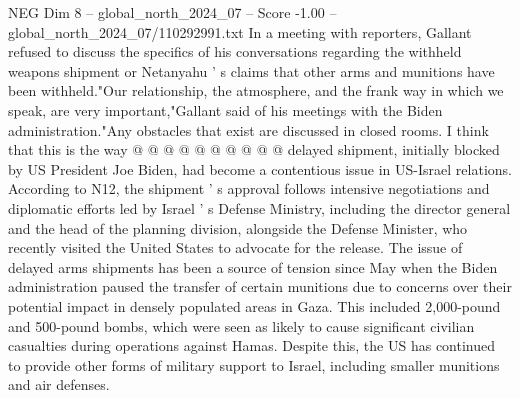 \begin{textsample}{NEG Dim 8 – global\_north\_2024\_07 – Score -1.00 – global\_north\_2024\_07/110292991.txt}
In a meeting with reporters, Gallant refused to discuss the specifics of his conversations regarding the withheld weapons shipment or Netanyahu ' s claims that other arms and munitions have been withheld."Our relationship, the atmosphere, and the frank way in which we speak, are very important,"Gallant said of his meetings with the Biden administration."Any obstacles that exist are discussed in closed rooms.
I think that this is the way @ @ @ @ @ @ @ @ @ @ delayed shipment, initially blocked by US President Joe Biden, had become a contentious issue in US-Israel relations.
According to N12, the shipment ' s approval follows intensive negotiations and diplomatic efforts led by Israel ' s Defense Ministry, including the director general and the head of the planning division, alongside the Defense Minister, who recently visited the United States to advocate for the release.
The issue of delayed arms shipments has been a source of tension since May when the Biden administration paused the transfer of certain munitions due to concerns over their potential impact in densely populated areas in Gaza.
This included 2,000-pound and 500-pound bombs, which were seen as likely to cause significant civilian casualties during operations against Hamas.
Despite this, the US has continued to provide other forms of military support to Israel, including smaller munitions and air defenses.

\end{textsample}
